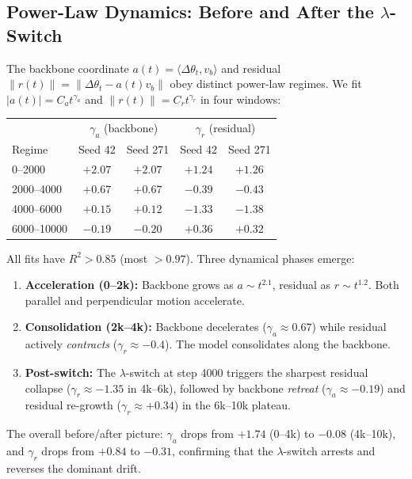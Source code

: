 \documentclass[11pt,a4paper]{article}
\begin{document}
\subsection{Power-Law Dynamics: Before and After the $\lambda$-Switch}

The backbone coordinate $a(t) = \langle \Delta\theta_t, v_b \rangle$ and residual $\|r(t)\| = \|\Delta\theta_t - a(t) v_b\|$ obey distinct power-law regimes. We fit $|a(t)| = C_a t^{\gamma_a}$ and $\|r(t)\| = C_r t^{\gamma_r}$ in four windows:

\begin{center}
\begin{tabular}{lcccc}
\toprule
 & \multicolumn{2}{c}{$\gamma_a$ (backbone)} & \multicolumn{2}{c}{$\gamma_r$ (residual)} \\
Regime & Seed 42 & Seed 271 & Seed 42 & Seed 271 \\
\midrule
0--2000 & $+2.07$ & $+2.07$ & $+1.24$ & $+1.26$ \\
2000--4000 & $+0.67$ & $+0.67$ & $-0.39$ & $-0.43$ \\
4000--6000 & $+0.15$ & $+0.12$ & $-1.33$ & $-1.38$ \\
6000--10000 & $-0.19$ & $-0.20$ & $+0.36$ & $+0.32$ \\
\bottomrule
\end{tabular}
\end{center}

All fits have $R^2 > 0.85$ (most $> 0.97$). Three dynamical phases emerge:

\begin{enumerate}
\item \textbf{Acceleration (0--2k):} Backbone grows as $a \sim t^{2.1}$, residual as $r \sim t^{1.2}$. Both parallel and perpendicular motion accelerate.
\item \textbf{Consolidation (2k--4k):} Backbone decelerates ($\gamma_a \approx 0.67$) while residual actively \emph{contracts} ($\gamma_r \approx -0.4$). The model consolidates along the backbone.
\item \textbf{Post-switch:} The $\lambda$-switch at step 4000 triggers the sharpest residual collapse ($\gamma_r \approx -1.35$ in 4k--6k), followed by backbone \emph{retreat} ($\gamma_a \approx -0.19$) and residual re-growth ($\gamma_r \approx +0.34$) in the 6k--10k plateau.
\end{enumerate}

The overall before/after picture: $\gamma_a$ drops from $+1.74$ (0--4k) to $-0.08$ (4k--10k), and $\gamma_r$ drops from $+0.84$ to $-0.31$, confirming that the $\lambda$-switch arrests and reverses the dominant drift.
\end{document}
